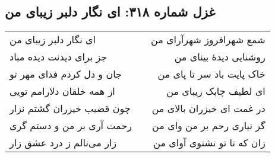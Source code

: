\begin{center}
\section*{غزل شماره ۳۱۸: ای نگار دلبر زیبای من}
\label{sec:318}
\begin{longtable}{l p{0.5cm} r}
ای نگار دلبر زیبای من
&&
شمع شهرافروز شهرآرای من
\\
جز برای دیدنت دیده مباد
&&
روشنایی دیدهٔ بینای من
\\
جان و دل کردم فدای مهر تو
&&
خاک پایت باد سر تا پای من
\\
از همه خلقان دلارامم تویی
&&
ای لطیف چابک زیبای من
\\
چون قضیب خیزران گشتم نزار
&&
در غمت ای خیزران بالای من
\\
رحمت آری بر من و دستم گری
&&
گر نیاری رحم بر من وای من
\\
زار می‌نالم ز درد عشق زار
&&
زان که تا تو نشنوی آوای من
\\
\end{longtable}
\end{center}
